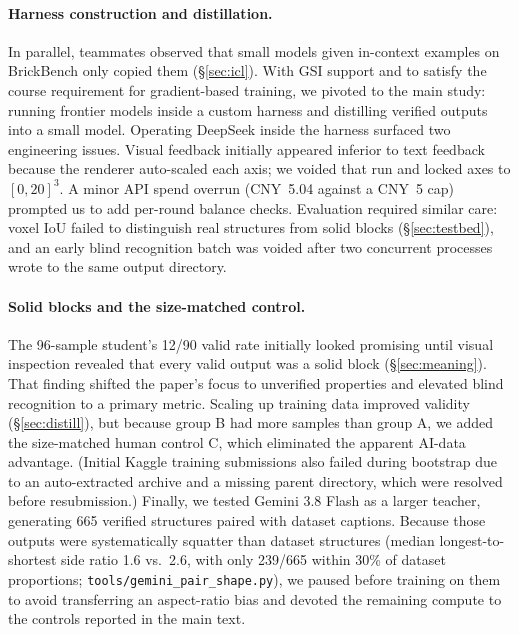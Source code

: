 \documentclass{article}
\begin{document}
\paragraph{Harness construction and distillation.}
In parallel, teammates observed that small models given in-context examples on BrickBench only copied them (\S\ref{sec:icl}). With GSI support and to satisfy the course requirement for gradient-based training, we pivoted to the main study: running frontier models inside a custom harness and distilling verified outputs into a small model. Operating DeepSeek inside the harness surfaced two engineering issues. Visual feedback initially appeared inferior to text feedback because the renderer auto-scaled each axis; we voided that run and locked axes to $[0,20]^3$. A minor API spend overrun (CNY~5.04 against a CNY~5 cap) prompted us to add per-round balance checks. Evaluation required similar care: voxel IoU failed to distinguish real structures from solid blocks (\S\ref{sec:testbed}), and an early blind recognition batch was voided after two concurrent processes wrote to the same output directory.

\paragraph{Solid blocks and the size-matched control.}
The 96-sample student's 12/90 valid rate initially looked promising until visual inspection revealed that every valid output was a solid block (\S\ref{sec:meaning}). That finding shifted the paper's focus to unverified properties and elevated blind recognition to a primary metric. Scaling up training data improved validity (\S\ref{sec:distill}), but because group B had more samples than group A, we added the size-matched human control C, which eliminated the apparent AI-data advantage. (Initial Kaggle training submissions also failed during bootstrap due to an auto-extracted archive and a missing parent directory, which were resolved before resubmission.) Finally, we tested Gemini 3.8 Flash as a larger teacher, generating 665 verified structures paired with dataset captions. Because those outputs were systematically squatter than dataset structures (median longest-to-shortest side ratio 1.6 vs.\ 2.6, with only 239/665 within 30\% of dataset proportions; \texttt{tools/gemini\_pair\_shape.py}), we paused before training on them to avoid transferring an aspect-ratio bias and devoted the remaining compute to the controls reported in the main text.
\end{document}
